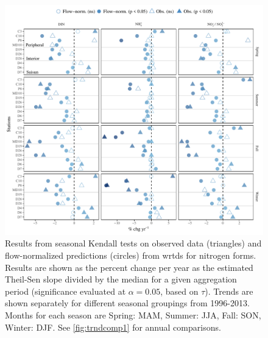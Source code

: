 \documentclass[letterpaper,12pt,oneside]{article}\usepackage[]{graphicx}\usepackage[]{color}
\begin{document}
\begin{figure}
\centering
\includegraphics[width=1\textwidth,page=1]{figs/trndcomp3.pdf}
\caption{Results from seasonal Kendall tests on observed data (triangles) and flow-normalized predictions (circles) from \ac{wrtds} for nitrogen forms. Results are shown as the percent change per year as the estimated Theil-Sen slope divided by the median for a given aggregation period (significance evaluated at $\alpha = 0.05$, based on $\tau$). Trends are shown separately for different seasonal groupings from 1996-2013. Months for each season are Spring: MAM, Summer: JJA, Fall: SON, Winter: DJF. See \cref{fig:trndcomp1} for annual comparisons.}
\label{fig:trndcomp3}   
\end{figure}

\clearpage
\end{document}
